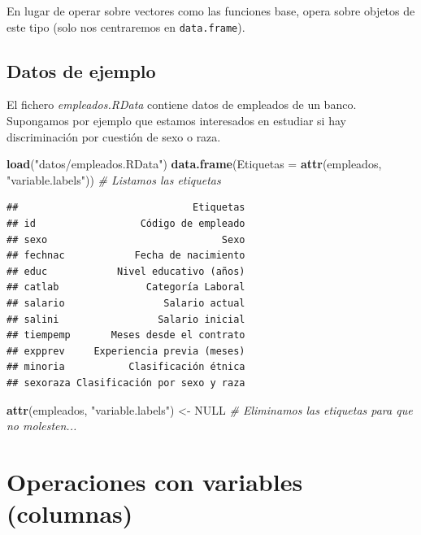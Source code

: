 \documentclass[]{book}
\newenvironment{Shaded}{\begin{snugshade}}{\end{snugshade}}
\newcommand{\KeywordTok}[1]{\textcolor[rgb]{0.13,0.29,0.53}{\textbf{#1}}}
\newcommand{\DataTypeTok}[1]{\textcolor[rgb]{0.13,0.29,0.53}{#1}}
\newcommand{\StringTok}[1]{\textcolor[rgb]{0.31,0.60,0.02}{#1}}
\newcommand{\CommentTok}[1]{\textcolor[rgb]{0.56,0.35,0.01}{\textit{#1}}}
\newcommand{\OtherTok}[1]{\textcolor[rgb]{0.56,0.35,0.01}{#1}}
\newcommand{\NormalTok}[1]{#1}
\begin{document}
En lugar de operar sobre vectores como las funciones base, opera sobre
objetos de este tipo (solo nos centraremos en \texttt{data.frame}).

\subsection{Datos de ejemplo}\label{datos-de-ejemplo-1}

El fichero \emph{empleados.RData} contiene datos de empleados de un
banco. Supongamos por ejemplo que estamos interesados en estudiar si hay
discriminación por cuestión de sexo o raza.

\begin{Shaded}
\begin{Highlighting}[]
\KeywordTok{load}\NormalTok{(}\StringTok{"datos/empleados.RData"}\NormalTok{)}
\KeywordTok{data.frame}\NormalTok{(}\DataTypeTok{Etiquetas =} \KeywordTok{attr}\NormalTok{(empleados, }\StringTok{"variable.labels"}\NormalTok{))  }\CommentTok{# Listamos las etiquetas}
\end{Highlighting}
\end{Shaded}

\begin{verbatim}
##                              Etiquetas
## id                  Código de empleado
## sexo                              Sexo
## fechnac            Fecha de nacimiento
## educ            Nivel educativo (años)
## catlab               Categoría Laboral
## salario                 Salario actual
## salini                 Salario inicial
## tiempemp       Meses desde el contrato
## expprev     Experiencia previa (meses)
## minoria           Clasificación étnica
## sexoraza Clasificación por sexo y raza
\end{verbatim}

\begin{Shaded}
\begin{Highlighting}[]
\KeywordTok{attr}\NormalTok{(empleados, }\StringTok{"variable.labels"}\NormalTok{) <-}\StringTok{ }\OtherTok{NULL}                  \CommentTok{# Eliminamos las etiquetas para que no molesten...}
\end{Highlighting}
\end{Shaded}

\section{Operaciones con variables
(columnas)}\label{operaciones-con-variables-columnas}
\end{document}
